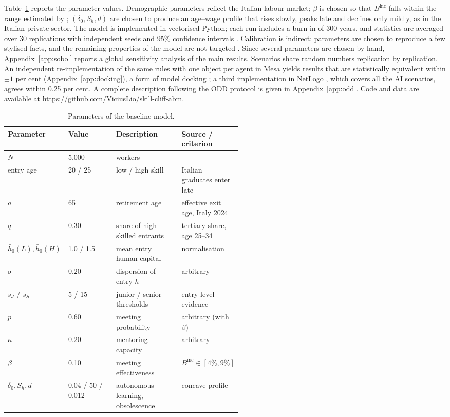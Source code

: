 \documentclass[preprint,12pt,authoryear]{elsarticle}
\begin{document}
Table~\ref{tab:params} reports the parameter values. Demographic parameters reflect the Italian labour market; $\beta$ is chosen so that $B^{\mathrm{inc}}$ falls within the range estimated by \citet{Jarosch2021}; $(\delta_0,S_h,d)$ are chosen to produce an age--wage profile that rises slowly, peaks late and declines only mildly, as in the Italian private sector. The model is implemented in vectorised Python; each run includes a burn-in of 300 years, and statistics are averaged over 30 replications with independent seeds and 95\% confidence intervals \citep[on the number of replications, see][]{Lee2015}. Calibration is indirect: parameters are chosen to reproduce a few stylised facts, and the remaining properties of the model are not targeted \citep{Windrum2007,Fagiolo2007}. Since several parameters are chosen by hand, Appendix~\ref{app:sobol} reports a global sensitivity analysis of the main results. Scenarios share random numbers replication by replication. An independent re-implementation of the same rules with one object per agent in Mesa \citep{Kazil2020} yields results that are statistically equivalent within $\pm1$ per cent (Appendix~\ref{app:docking}), a form of model docking \citep{Axtell1996}; a third implementation in NetLogo \citep{Wilensky1999}, which covers all the AI scenarios, agrees within 0.25 per cent. A complete description following the ODD protocol is given in Appendix~\ref{app:odd}. Code and data are available at \url{https://github.com/ViciusLio/skill-cliff-abm}.

\begin{table}[t]\centering\small
\caption{Parameters of the baseline model.}\label{tab:params}
\begin{tabular}{@{}l l p{0.29\linewidth} p{0.24\linewidth}@{}}
\toprule
Parameter & Value & Description & Source / criterion \\
\midrule
$N$ & 5{,}000 & workers & --- \\
entry age & 20 / 25 & low / high skill & Italian graduates enter late \\
$\bar a$ & 65 & retirement age & effective exit age, Italy 2024 \\
$q$ & 0.30 & share of high-skilled entrants & tertiary share, age 25--34 \\
$\bar h_0(L),\bar h_0(H)$ & 1.0 / 1.5 & mean entry human capital & normalisation \\
$\sigma$ & 0.20 & dispersion of entry $h$ & arbitrary \\
$s_J$ / $s_S$ & 5 / 15 & junior / senior thresholds & entry-level evidence \\
$p$ & 0.60 & meeting probability & arbitrary (with $\beta$) \\
$\kappa$ & 0.20 & mentoring capacity & arbitrary \\
$\beta$ & 0.10 & meeting effectiveness & $B^{\mathrm{inc}}\in[4\%,9\%]$ \\
$\delta_0, S_h, d$ & 0.04 / 50 / 0.012 & autonomous learning, obsolescence & concave profile \\
\bottomrule
\end{tabular}
\end{table}
\end{document}
